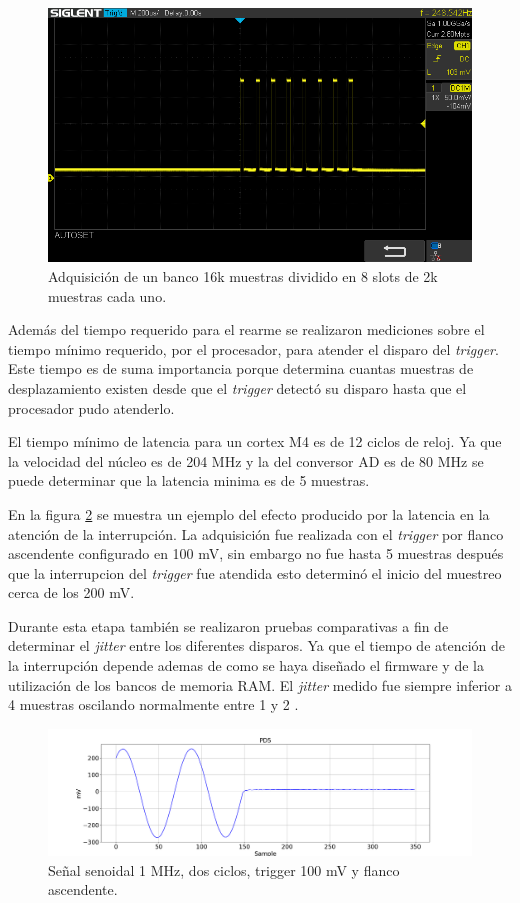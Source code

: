 \begin{figure}[ht]
	\centering
	\includegraphics[width=140mm]{./Figures/disparos.png}
	\caption{Adquisición de un banco 16k muestras dividido en 8 slots de 2k muestras cada uno.}
	\label{fig:oscDisparos}
\end{figure}


Además del tiempo requerido para el rearme se realizaron mediciones sobre el tiempo mínimo requerido, por el procesador, para atender el disparo del \textit{trigger}. Este tiempo es de suma importancia porque determina cuantas muestras de desplazamiento existen desde que el \textit{trigger} detectó su disparo hasta que el procesador pudo atenderlo. 

El tiempo mínimo de latencia para un cortex M4 es de 12 ciclos de reloj. Ya que la velocidad del núcleo es de 204 MHz y la del conversor AD es de 80 MHz se puede determinar que la latencia minima es de 5 muestras. 

En la figura \ref{fig:tiempoInicial} se muestra un ejemplo del efecto producido por la latencia en la atención de la interrupción. La adquisición fue realizada con el \textit{trigger} por flanco ascendente configurado en 100 mV, sin embargo no fue hasta 5 muestras después que la interrupcion del \textit{trigger} fue atendida esto determinó el inicio del muestreo cerca de los 200 mV.

Durante esta etapa también se realizaron pruebas comparativas a fin de determinar el \textit{jitter} entre los diferentes disparos. Ya que el tiempo de atención de la interrupción depende ademas de como se haya diseñado el firmware y de la utilización de los bancos de memoria RAM. El \textit{jitter} medido fue siempre inferior a 4 muestras oscilando normalmente entre 1 y 2 .

\begin{figure}[htpb]
	\hspace{-1.2cm}
	\includegraphics[width=165mm]{./Figures/tiempoInicial.png}
	\caption{Señal senoidal 1 MHz, dos ciclos, trigger 100 mV y flanco ascendente.}
	\label{fig:tiempoInicial}
\end{figure}


